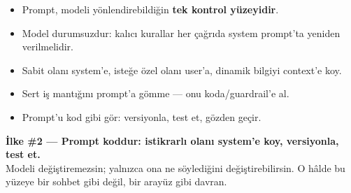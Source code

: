 \begin{itemize}
  \item Prompt, modeli yönlendirebildiğin \textbf{tek kontrol yüzeyidir}.
  \item Model durumsuzdur: kalıcı kurallar her çağrıda system prompt'ta yeniden verilmelidir.
  \item Sabit olanı system'e, isteğe özel olanı user'a, dinamik bilgiyi context'e koy.
  \item Sert iş mantığını prompt'a gömme --- onu koda/guardrail'e al.
  \item Prompt'u kod gibi gör: versiyonla, test et, gözden geçir.
\end{itemize}

\begin{principlebox}
\textbf{İlke \#2 — Prompt koddur: istikrarlı olanı system'e koy, versiyonla, test et.}\\[4pt]
\normalsize Modeli değiştiremezsin; yalnızca ona ne söylediğini değiştirebilirsin.
O hâlde bu yüzeye bir sohbet gibi değil, bir arayüz gibi davran.
\end{principlebox}

